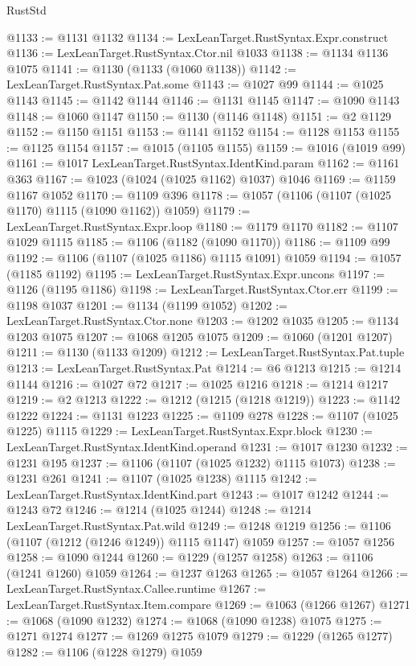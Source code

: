 \begin{lexlean}{RustStd}
\begin{coremodule}
{\begin{coremodule}
{{{{{{{{{{{{{{{{{{{{{{{{{{{{{{{{{{{@1133 := @1131 @1132
@1134 := LexLeanTarget.RustSyntax.Expr.construct
@1136 := LexLeanTarget.RustSyntax.Ctor.nil @1033
@1138 := @1134 @1136 @1075
@1141 := @1130 (@1133 (@1060 @1138))
@1142 := LexLeanTarget.RustSyntax.Pat.some
@1143 := @1027 @99
@1144 := @1025 @1143
@1145 := @1142 @1144
@1146 := @1131 @1145
@1147 := @1090 @1143
@1148 := @1060 @1147
@1150 := @1130 (@1146 @1148)
@1151 := @2 @1129
@1152 := @1150 @1151
@1153 := @1141 @1152
@1154 := @1128 @1153
@1155 := @1125 @1154
@1157 := @1015 (@1105 @1155)
@1159 := @1016 (@1019 @99)
@1161 := @1017 LexLeanTarget.RustSyntax.IdentKind.param
@1162 := @1161 @363
@1167 := @1023 (@1024 (@1025 @1162) @1037) @1046
@1169 := @1159 @1167 @1052
@1170 := @1109 @396
@1178 := @1057 (@1106 (@1107 (@1025 @1170) @1115 (@1090 @1162)) @1059)
@1179 := LexLeanTarget.RustSyntax.Expr.loop
@1180 := @1179 @1170
@1182 := @1107 @1029 @1115
@1185 := @1106 (@1182 (@1090 @1170))
@1186 := @1109 @99
@1192 := @1106 (@1107 (@1025 @1186) @1115 @1091) @1059
@1194 := @1057 (@1185 @1192)
@1195 := LexLeanTarget.RustSyntax.Expr.uncons
@1197 := @1126 (@1195 @1186)
@1198 := LexLeanTarget.RustSyntax.Ctor.err
@1199 := @1198 @1037
@1201 := @1134 (@1199 @1052)
@1202 := LexLeanTarget.RustSyntax.Ctor.none
@1203 := @1202 @1035
@1205 := @1134 @1203 @1075
@1207 := @1068 @1205 @1075
@1209 := @1060 (@1201 @1207)
@1211 := @1130 (@1133 @1209)
@1212 := LexLeanTarget.RustSyntax.Pat.tuple
@1213 := LexLeanTarget.RustSyntax.Pat
@1214 := @6 @1213
@1215 := @1214 @1144
@1216 := @1027 @72
@1217 := @1025 @1216
@1218 := @1214 @1217
@1219 := @2 @1213
@1222 := @1212 (@1215 (@1218 @1219))
@1223 := @1142 @1222
@1224 := @1131 @1223
@1225 := @1109 @278
@1228 := @1107 (@1025 @1225) @1115
@1229 := LexLeanTarget.RustSyntax.Expr.block
@1230 := LexLeanTarget.RustSyntax.IdentKind.operand
@1231 := @1017 @1230
@1232 := @1231 @195
@1237 := @1106 (@1107 (@1025 @1232) @1115 @1073)
@1238 := @1231 @261
@1241 := @1107 (@1025 @1238) @1115
@1242 := LexLeanTarget.RustSyntax.IdentKind.part
@1243 := @1017 @1242
@1244 := @1243 @72
@1246 := @1214 (@1025 @1244)
@1248 := @1214 LexLeanTarget.RustSyntax.Pat.wild
@1249 := @1248 @1219
@1256 := @1106 (@1107 (@1212 (@1246 @1249)) @1115 @1147) @1059
@1257 := @1057 @1256
@1258 := @1090 @1244
@1260 := @1229 (@1257 @1258)
@1263 := @1106 (@1241 @1260) @1059
@1264 := @1237 @1263
@1265 := @1057 @1264
@1266 := LexLeanTarget.RustSyntax.Callee.runtime
@1267 := LexLeanTarget.RustSyntax.Item.compare
@1269 := @1063 (@1266 @1267)
@1271 := @1068 (@1090 @1232)
@1274 := @1068 (@1090 @1238) @1075
@1275 := @1271 @1274
@1277 := @1269 @1275 @1079
@1279 := @1229 (@1265 @1277)
@1282 := @1106 (@1228 @1279) @1059
}}}}}}}}}}}}}}}}}}}}}}}}}}}}}}}}}}}
\end{coremodule}}
\end{coremodule}
\end{lexlean}
